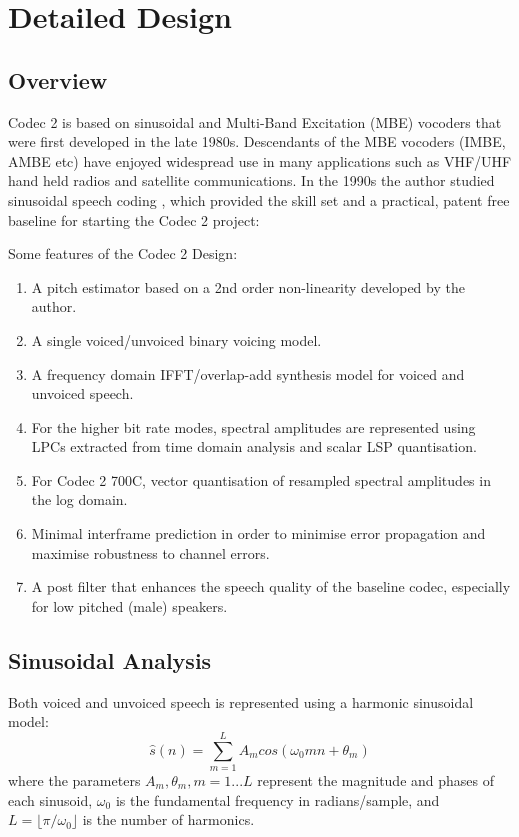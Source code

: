 \documentclass{article}
\begin{document}
\section{Detailed Design}
\label{sect:details}

\subsection{Overview}

Codec 2 is based on sinusoidal \cite{mcaulay1986speech} and Multi-Band Excitation (MBE) \cite{griffin1988multiband} vocoders that were first developed in the late 1980s.  Descendants of the MBE vocoders (IMBE, AMBE etc) have enjoyed widespread use in many applications such as VHF/UHF hand held radios and satellite communications. In the 1990s the author studied sinusoidal speech coding \cite{rowe1997techniques}, which provided the skill set and a practical, patent free baseline for starting the Codec 2 project:

Some features of the Codec 2 Design:
\begin{enumerate}
\item A pitch estimator based on a 2nd order non-linearity developed by the author.
\item A single voiced/unvoiced binary voicing model.
\item A frequency domain IFFT/overlap-add synthesis model for voiced and unvoiced speech.
\item For the higher bit rate modes, spectral amplitudes are represented using LPCs extracted from time domain analysis and scalar LSP quantisation.
\item For Codec 2 700C, vector quantisation of resampled spectral amplitudes in the log domain.
\item Minimal interframe prediction in order to minimise error propagation and maximise robustness to channel errors.
\item A post filter that enhances the speech quality of the baseline codec, especially for low pitched (male) speakers.
\end{enumerate}

\subsection{Sinusoidal Analysis}

Both voiced and unvoiced speech is represented using a harmonic sinusoidal model:
\begin{equation}
\hat{s}(n) = \sum_{m=1}^L A_m cos(\omega_0 m n + \theta_m)
\end{equation}
where the parameters $A_m, \theta_m, m=1...L$ represent the magnitude and phases of each sinusoid, $\omega_0$ is the fundamental frequency in radians/sample, and $L=\lfloor \pi/\omega_0 \rfloor$ is the number of harmonics.
\end{document}
